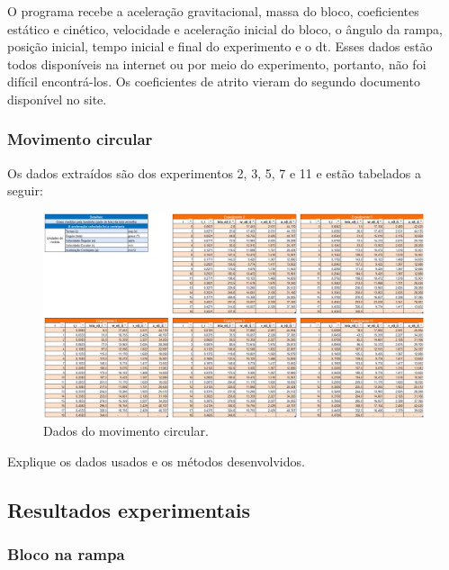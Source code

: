 \documentclass{article}
\begin{document}
\qquad O programa recebe a aceleração gravitacional, massa do bloco, coeficientes estático e cinético, velocidade e aceleração inicial do bloco, o ângulo da rampa, posição inicial, tempo inicial e final do experimento e o dt. Esses dados estão todos disponíveis na internet ou por meio do experimento, portanto, não foi difícil encontrá-los. Os coeficientes de atrito vieram do segundo documento disponível no site.



\subsubsection{Movimento circular}
\qquad Os dados extraídos são dos experimentos 2, 3, 5, 7 e 11 e estão tabelados a seguir:


\begin{figure}[!h]
    \centering
    \includegraphics[width=16cm]{./img/tabelas_movimento_circular.png}
    \caption{Dados do movimento circular.}
\end{figure}


\qquad Explique os dados usados e os métodos desenvolvidos.

\subsection{Resultados experimentais}

\subsubsection{Bloco na rampa}
\end{document}
